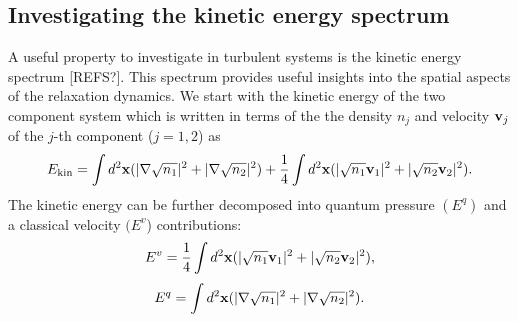 \subsection{Investigating the kinetic energy spectrum}
A useful property to investigate in turbulent systems is the kinetic energy
spectrum [REFS?].
This spectrum provides useful insights into the spatial aspects of the
relaxation dynamics.
We start with the kinetic energy of the two component system which is written
in terms of the the density $n_j$ and velocity $\vb{v}_j$ of the $j$-th
component ($j=1,2$) as
\begin{equation}
    E_\mathrm{kin} = \int d^2\vb{x} (|\nabla\sqrt{n_1}|^2 
    + |\nabla\sqrt{n_2}|^2)
    + \frac{1}{4}\int d^2\vb{x} (|\sqrt{n_1}\vb{v}_1|^2 
    + |\sqrt{n_2}\vb{v}_2|^2).
\end{equation}
The kinetic energy can be further decomposed into quantum pressure
$(E^q)$ and a classical velocity $(E^v$) contributions:
\begin{equation}
    E^v = \frac{1}{4}\int d^2\vb{x} (|\sqrt{n_1}\vb{v}_1|^2 
    + |\sqrt{n_2}\vb{v}_2|^2),
\end{equation}
\begin{equation}
    E^q = \int d^2\vb{x} (|\nabla\sqrt{n_1}|^2 
    + |\nabla\sqrt{n_2}|^2).
\end{equation}

